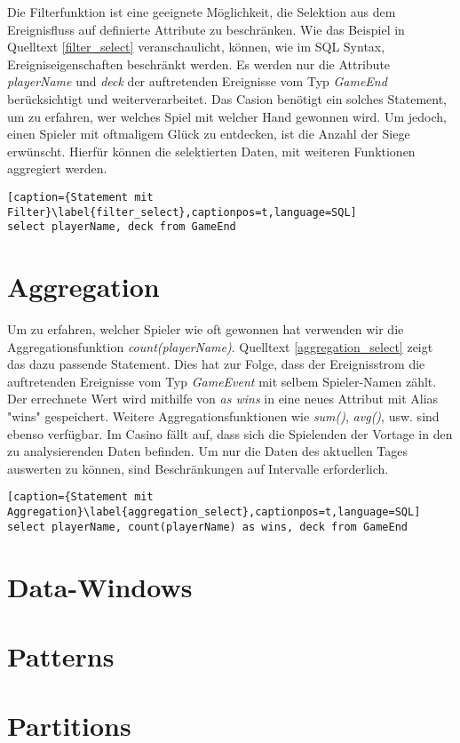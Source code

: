 Die Filterfunktion ist eine geeignete Möglichkeit, die Selektion aus dem Ereignisfluss auf definierte Attribute zu beschränken. Wie das Beispiel in Quelltext \ref{filter_select} veranschaulicht, können, wie im SQL Syntax, Ereigniseigenschaften beschränkt werden.
Es werden nur die Attribute \textit{playerName} und \textit{deck} der auftretenden Ereignisse vom Typ \textit{GameEnd} berücksichtigt und weiterverarbeitet.
Das Casion benötigt ein solches Statement, um zu erfahren, wer welches Spiel mit welcher Hand gewonnen wird. Um jedoch, einen Spieler mit oftmaligem Glück zu entdecken, ist die Anzahl der Siege erwünscht. Hierfür können die selektierten Daten, mit weiteren Funktionen aggregiert werden.

\begin{lstlisting}[caption={Statement mit Filter}\label{filter_select},captionpos=t,language=SQL]
select playerName, deck from GameEnd
\end{lstlisting}

\section{Aggregation}

Um zu erfahren, welcher Spieler wie oft gewonnen hat verwenden wir die Aggregationsfunktion \textit{count(playerName)}. Quelltext \ref{aggregation_select} zeigt das dazu passende Statement. Dies hat zur Folge, dass der Ereignisstrom die auftretenden Ereignisse vom Typ \textit{GameEvent} mit selbem Spieler-Namen zählt. Der errechnete Wert wird mithilfe von \textit{as wins} in eine neues Attribut mit Alias "wins" gespeichert. Weitere Aggregationsfunktionen wie \textit{sum()}, \textit{avg()}, usw. sind ebenso verfügbar.
Im Casino fällt auf, dass sich die Spielenden der Vortage in den zu analysierenden Daten befinden. Um nur die Daten des aktuellen Tages auswerten zu können, sind Beschränkungen auf Intervalle erforderlich.

\begin{lstlisting}[caption={Statement mit Aggregation}\label{aggregation_select},captionpos=t,language=SQL]
select playerName, count(playerName) as wins, deck from GameEnd
\end{lstlisting}

\section{Data-Windows}
\label{Data-Windows}

\section{Patterns}

\section{Partitions}